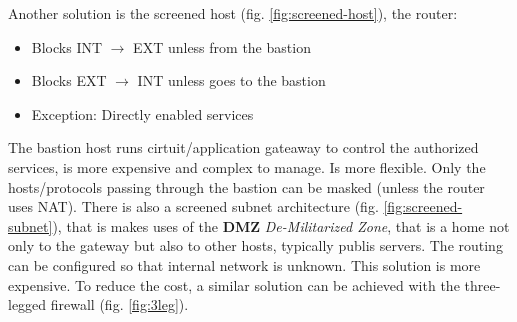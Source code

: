 \documentclass[12pt]{article}
\begin{document}
Another solution is the screened host (fig. \ref{fig:screened-host}), the router:
\begin{itemize}
  \item Blocks INT $\rightarrow$ EXT unless from the bastion
  \item Blocks EXT $\rightarrow$ INT unless goes to the bastion
  \item Exception: Directly enabled services
\end{itemize}
The bastion host runs cirtuit/application gateaway to control the authorized services, is more expensive and complex to manage. Is more flexible. Only the hosts/protocols passing through the bastion can be masked (unless the router uses NAT). There is also a screened subnet architecture (fig. \ref{fig:screened-subnet}), that is makes uses of the \textbf{DMZ} \textit{De-Militarized Zone}, that is a home not only to the gateway but also to other hosts, typically publis servers. The routing can be configured so that internal network is unknown. This solution is more expensive. To reduce the cost, a similar solution can be achieved with the three-legged firewall (fig. \ref{fig:3leg}).
\end{document}
